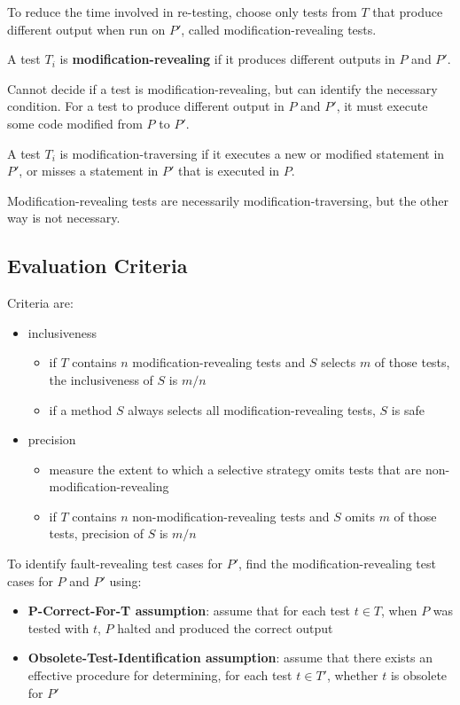 \documentclass[11pt]{article}
\begin{document}
To reduce the time involved in re-testing, choose only tests from \(T\) that produce
different output when run on \(P'\), called modification-revealing tests.

A test \(T_{i}\) is \textbf{modification-revealing} if it produces different outputs in \(P\)
and \(P'\).

Cannot decide if a test is modification-revealing, but can identify the
necessary condition.
For a test to produce different output in \(P\) and \(P'\), it must execute some code
modified from \(P\) to \(P'\).

A test \(T_{i}\) is modification-traversing if it executes a new or modified statement
in \(P'\), or misses a statement in \(P'\) that is executed in \(P\).

Modification-revealing tests are necessarily modification-traversing, but the
other way is not necessary.
\subsection{Evaluation Criteria}
\label{sec:orga03c270}
Criteria are:
\begin{itemize}
\item inclusiveness
\begin{itemize}
\item if \(T\) contains \(n\) modification-revealing tests and \(S\) selects \(m\) of those
tests, the inclusiveness of \(S\) is \(m/n\)
\item if a method \(S\) always selects all modification-revealing tests, \(S\) is safe
\end{itemize}
\item precision
\begin{itemize}
\item measure the extent to which a selective strategy omits tests that are
non-modification-revealing
\item if \(T\) contains \(n\) non-modification-revealing tests and \(S\) omits \(m\) of
those tests, precision of \(S\) is \(m/n\)
\end{itemize}
\end{itemize}

To identify fault-revealing test cases for \(P'\), find the modification-revealing
test cases for \(P\) and \(P'\) using:
\begin{itemize}
\item \textbf{P-Correct-For-T assumption}: assume that for each test \(t \in T\), when \(P\)
was tested with \(t\), \(P\) halted and produced the correct output
\item \textbf{Obsolete-Test-Identification assumption}: assume that there exists an
effective procedure for determining, for each test \(t \in T'\), whether \(t\)
is obsolete for \(P'\)
\end{itemize}
\end{document}
